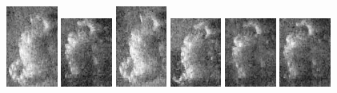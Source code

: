 \begin{figure}
    \includegraphics[width=0.15\textwidth]{chapters/images/dataset/all-class-images/hook/hook-16.jpg}
    \includegraphics[width=0.15\textwidth]{chapters/images/dataset/all-class-images/hook/hook-44.jpg}
    \includegraphics[width=0.15\textwidth]{chapters/images/dataset/all-class-images/hook/hook-15.jpg}    
    \includegraphics[width=0.15\textwidth]{chapters/images/dataset/all-class-images/hook/hook-33.jpg}
    \includegraphics[width=0.15\textwidth]{chapters/images/dataset/all-class-images/hook/hook-47.jpg}
    \includegraphics[width=0.15\textwidth]{chapters/images/dataset/all-class-images/hook/hook-45.jpg}
    

\end{figure}
